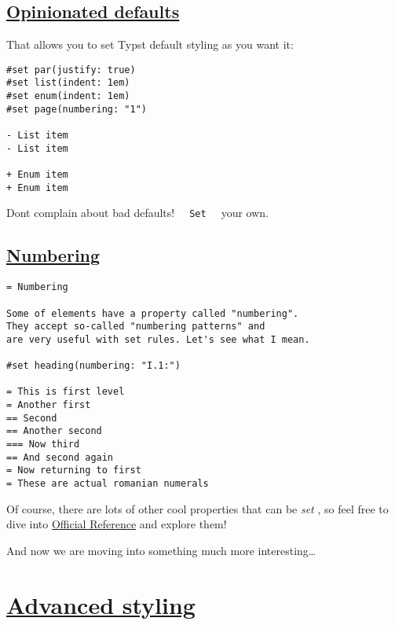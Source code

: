 \subsection{\texorpdfstring{\hyperref[opinionated-defaults]{Opinionated
defaults}}{Opinionated defaults}}\label{opinionated-defaults}

That allows you to set Typst default styling as you want it:

\begin{verbatim}
#set par(justify: true)
#set list(indent: 1em)
#set enum(indent: 1em)
#set page(numbering: "1")

- List item
- List item

+ Enum item
+ Enum item
\end{verbatim}

\pandocbounded{}

Don\textquotesingle t complain about bad defaults!
\texttt{\ }{\texttt{\ Set\ }}\texttt{\ } your own.

\subsection{\texorpdfstring{\hyperref[numbering]{Numbering}}{Numbering}}\label{numbering}

\begin{verbatim}
= Numbering

Some of elements have a property called "numbering".
They accept so-called "numbering patterns" and
are very useful with set rules. Let's see what I mean.

#set heading(numbering: "I.1:")

= This is first level
= Another first
== Second
== Another second
=== Now third
== And second again
= Now returning to first
= These are actual romanian numerals
\end{verbatim}

\pandocbounded{}

Of course, there are lots of other cool properties that can be
\emph{set} , so feel free to dive into
\href{https://typst.app/docs/reference/}{Official Reference} and explore
them!

And now we are moving into something much more interesting\ldots{}

\section{\texorpdfstring{\hyperref[advanced-styling]{Advanced
styling}}{Advanced styling}}\label{advanced-styling}

